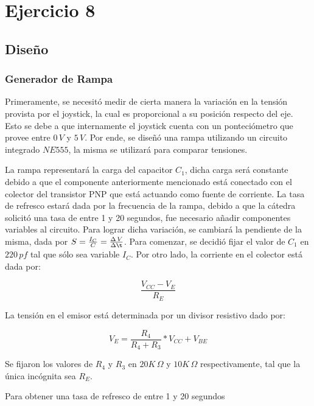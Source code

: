 \section{Ejercicio 8}

\subsection{Diseño}

\subsubsection{Generador de Rampa}

Primeramente, se necesitó medir de cierta manera la variación en la tensión provista por el joystick, la cual es proporcional a su posición respecto del eje. Esto se debe a que internamente el joystick cuenta con un ponteciómetro que provee entre $0\,V$ y $5\,V$. Por ende, se diseñó una rampa utilizando un circuito integrado $NE555$, la misma se utilizará para comparar tensiones. \par


La rampa representará la carga del capacitor $C_1$, dicha carga será constante debido a que el componente anteriormente mencionado está conectado con el colector del transistor PNP que está actuando como fuente de corriente. La tasa de refresco estará dada por la frecuencia de la rampa, debido a que la cátedra solicitó una tasa de entre 1 y 20 segundos, fue necesario añadir componentes variables al circuito. Para lograr dicha variación, se cambiará la pendiente de la misma, dada por $S=\frac{I_C}{C}=\frac{\Delta\,V}{\Delta\t}$. Para comenzar, se decidió fijar el valor de $C_1$ en $220\,pf$ tal que sólo sea variable $I_C$. Por otro lado, la corriente en el colector está dada por:

\begin{equation}
\frac{V_{CC}-V_E}{R_E}
\end{equation}

La tensión en el emisor está determinada por un divisor resistivo dado por:

\begin{equation}
V_E=\frac{R_4}{R_4+R_3} * V_{CC} + V_{BE}
\end{equation}

Se fijaron los valores de $R_4$ y $R_3$ en $20K\,\Omega$ y $10K\,\Omega$ respectivamente, tal que la única incógnita sea $R_E$. \par
Para obtener una tasa de refresco de entre 1 y 20 segundos





